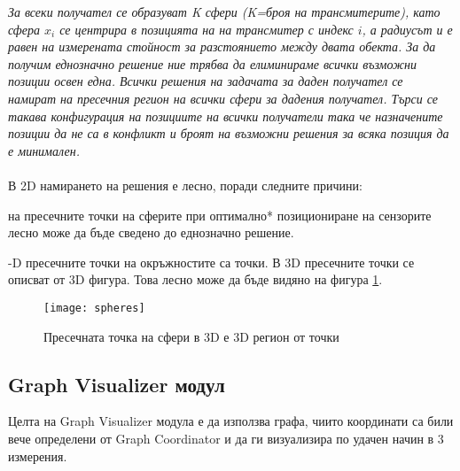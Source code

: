 \textit{За всеки получател се образуват K сфери (K=броя на трансмитерите), като сфера $x_i$ се центрира в позицията на на трансмитер с индекс $i$, а радиусът и е равен на измерената стойност за разстоянието между двата обекта. За да получим еднозначно решение ние трябва да елиминираме всички възможни позиции освен една. Всички решения на задачата за даден получател се намират на пресечния регион на всички сфери за дадения получател. Търси се такава конфигурация на позициите на всички получатели така че назначените позиции да не са в конфликт и броят на възможни решения за всяка позиция да е минимален.}\\\\

В 2D намирането на решения е лесно, поради следните причини:

\begin{enumerate}
     на пресечните точки на сферите при оптимално* позициониране на сензорите лесно може да бъде сведено до еднозначно решение.

    -D пресечните точки на окръжностите са точки. В 3D пресечните точки се описват от 3D фигура. Това лесно може да бъде видяно на фигура \ref{spheres}.
\end{enumerate}

\begin{figure}
    \centerline{\texttt{[image: spheres]}}
    \caption{Пресечната точка на сфери в 3D е 3D регион от точки}
    \label{spheres}
\end{figure}

\pagebreak

\subsection{Graph Visualizer модул}
Целта на Graph Visualizer модула е да използва графа, чиито координати са били вече определени от Graph Coordinator и да ги визуализира по удачен начин в 3 измерения.